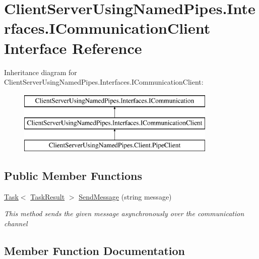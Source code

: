 \hypertarget{interface_client_server_using_named_pipes_1_1_interfaces_1_1_i_communication_client}{}\section{Client\+Server\+Using\+Named\+Pipes.\+Interfaces.\+I\+Communication\+Client Interface Reference}
\label{interface_client_server_using_named_pipes_1_1_interfaces_1_1_i_communication_client}
Inheritance diagram for Client\+Server\+Using\+Named\+Pipes.\+Interfaces.\+I\+Communication\+Client\+:\begin{figure}[H]
\begin{center}
\leavevmode
\includegraphics[height=3.000000cm]{interface_client_server_using_named_pipes_1_1_interfaces_1_1_i_communication_client}
\end{center}
\end{figure}
\subsection*{Public Member Functions}
\begin{DoxyCompactItemize}
\item 
\hyperlink{class_system_1_1_threading_1_1_tasks_1_1_task}{Task}$<$ \hyperlink{class_client_server_using_named_pipes_1_1_utilities_1_1_task_result}{Task\+Result} $>$ \hyperlink{interface_client_server_using_named_pipes_1_1_interfaces_1_1_i_communication_client_a07c2acf92bd0b99d704156010b47eff1}{Send\+Message} (string message)
\begin{DoxyCompactList}\small\item\em This method sends the given message asynchronously over the communication channel \end{DoxyCompactList}\end{DoxyCompactItemize}


\subsection{Member Function Documentation}
\mbox{\label{interface_client_server_using_named_pipes_1_1_interfaces_1_1_i_communication_client_a07c2acf92bd0b99d704156010b47eff1}} 
